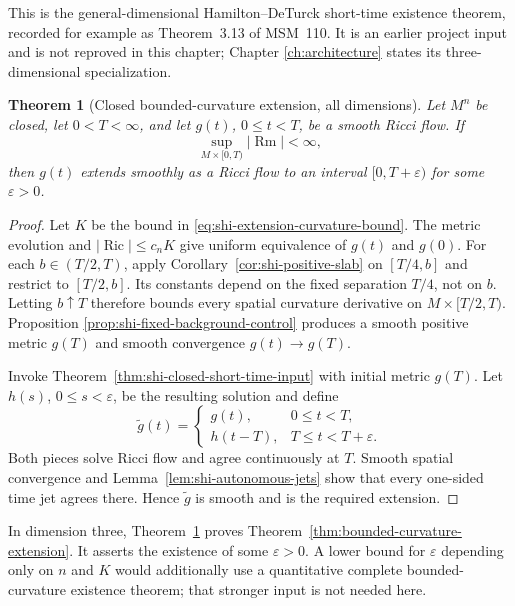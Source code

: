 \documentclass[10pt]{coll-l}
\newtheorem{theorem}{Theorem}[chapter]
\theoremstyle{definition}
\theoremstyle{remark}
\numberwithin{section}{chapter}
\numberwithin{equation}{chapter}
\newcommand{\Ric}{\operatorname{Ric}}
\newcommand{\Rm}{\operatorname{Rm}}
\begin{document}
This is the general-dimensional Hamilton--DeTurck short-time existence
theorem, recorded for example as Theorem~3.13 of MSM~110.  It is an earlier
project input and is not reproved in this chapter; Chapter
\ref{ch:architecture} states its three-dimensional specialization.

\begin{theorem}[Closed bounded-curvature extension, all dimensions]
\label{thm:shi-closed-extension}
Let $M^n$ be closed, let $0<T<\infty$, and let $g(t)$, $0\leq t<T$, be a
smooth Ricci flow.  If
\begin{equation}
             \sup_{M\times[0,T)}|\Rm|<\infty,             \label{eq:shi-extension-curvature-bound}
\end{equation}
then $g(t)$ extends smoothly as a Ricci flow to an interval
$[0,T+\varepsilon)$ for some $\varepsilon>0$.
\end{theorem}

\begin{proof}
Let $K$ be the bound in \eqref{eq:shi-extension-curvature-bound}.  The
metric evolution and $|\Ric|\leq c_nK$ give uniform equivalence of $g(t)$
and $g(0)$.  For each $b\in(T/2,T)$, apply
Corollary~\ref{cor:shi-positive-slab} on $[T/4,b]$ and restrict to
$[T/2,b]$.  Its constants depend on the fixed separation $T/4$, not on
$b$.  Letting $b\uparrow T$ therefore bounds every spatial curvature
derivative on $M\times[T/2,T)$.  Proposition
\ref{prop:shi-fixed-background-control} produces a smooth positive metric
$g(T)$ and smooth convergence $g(t)\to g(T)$.

Invoke Theorem~\ref{thm:shi-closed-short-time-input} with initial metric
$g(T)$.  Let $h(s)$, $0\leq s<\varepsilon$, be the resulting solution and
define
\[
 \widetilde g(t)=
 \begin{cases}
   g(t),&0\leq t<T,\\
   h(t-T),&T\leq t<T+\varepsilon.
 \end{cases}
\]
Both pieces solve Ricci flow and agree continuously at $T$.  Smooth spatial
convergence and Lemma~\ref{lem:shi-autonomous-jets} show that every
one-sided time jet agrees there.  Hence $\widetilde g$ is smooth and is the
required extension.
\end{proof}

In dimension three, Theorem~\ref{thm:shi-closed-extension} proves
Theorem~\ref{thm:bounded-curvature-extension}.  It asserts the existence of
some $\varepsilon>0$.  A lower bound for $\varepsilon$ depending only on
$n$ and $K$ would additionally use a quantitative complete
bounded-curvature existence theorem; that stronger input is not needed
here.
\end{document}
